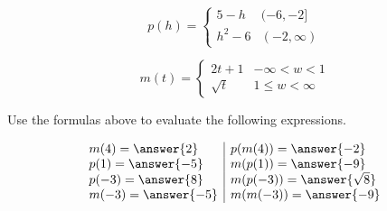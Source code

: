 \documentclass{ximera}
\author{Lee Wayand}
\begin{document}
\begin{exercise}





\[
p(h) = 
\begin{cases}
  5 - h &  (-6, -2]   \\
  h^2 - 6 & (-2, \infty)
\end{cases}
\]





\[
m(t) = 
\begin{cases}
  2t + 1 &   -\infty < w < 1 \\
  \sqrt{t} &  1 \leq w < \infty
\end{cases}
\]







Use the formulas above to evaluate the following expressions.



\[
\begin{array}{l|l}
m(4) = \answer{2}  & p(m(4)) = \answer{-2}   \\
p(1) = \answer{-5}  & m(p(1)) = \answer{-9}   \\
p(-3) = \answer{8}  & m(p(-3)) = \answer{\sqrt{8}}   \\
m(-3) = \answer{-5}  & m(m(-3)) = \answer{-9}   \\

\end{array}
\]



















\end{exercise}
\end{document}
